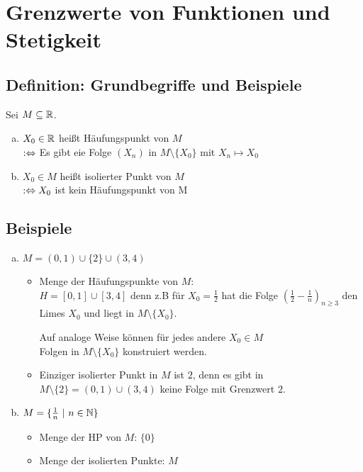 \documentclass[10pt, a4paper, fleqn]{article}
\begin{document}
    \section{Grenzwerte von Funktionen und Stetigkeit}
    \subsection{Definition: Grundbegriffe und Beispiele}

    Sei $M \subseteq \mathbb{R}$.
    \begin{enumerate}[a)]
        \item $X_0 \in \mathbb{R}$ heißt Häufungspunkt von $M$ \\
         $:\Leftrightarrow$ Es gibt eie Folge $(X_n)$ in
        $M \setminus \{X_0\}$ mit $X_n \mapsto X_0$
        
        \item $X_0 \in M$ heißt isolierter Punkt von $M$ \\
        $:\Leftrightarrow X_0$ ist kein Häufungspunkt von M
    \end{enumerate}

    \subsection{Beispiele}
    \begin{enumerate}[a)]
        \item $M = (0, 1) \cup \{2\} \cup (3, 4)$
        \begin{itemize}
            \item Menge der Häufungspunkte von $M$: \\
            $H = [0,1] \cup [3,4]$
            denn z.B für $X_0 = \frac{1}{2}$ hat die Folge
            $(\frac{1}{2} - \frac{1}{n})_{n \geq 3}$ den Limes
            $X_0$ und liegt in $M \setminus \{X_0\}$.

            Auf analoge Weise können für jedes andere $X_0 \in M$ \\
            Folgen in $M \setminus \{X_0\}$ konstruiert werden.

            \item Einziger isolierter Punkt in $M$ ist $2$, denn es gibt in \\ 
            $M \setminus \{2\} = (0,1) \cup (3,4)$ keine Folge
            mit Grenzwert $2$.
        \end{itemize}
        \item $M = \{\frac{1}{n} \ | \ n \in \mathbb{N}\}$
        \begin{itemize}
            \item Menge der HP von $M$: $\{0\}$
            \item Menge der isolierten Punkte: $M$
        \end{itemize}
    \end{enumerate}
\end{document}
